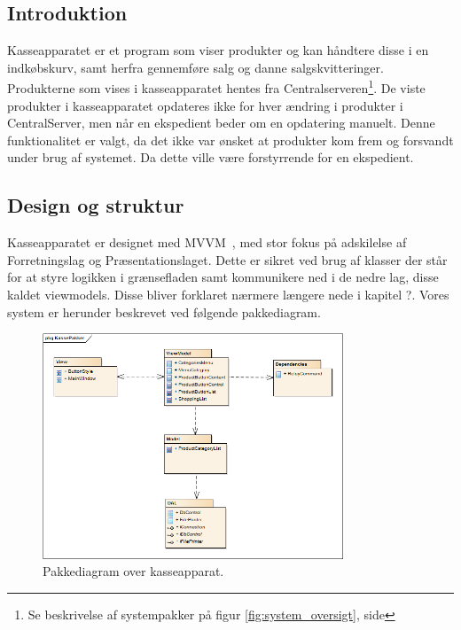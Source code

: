 \subsection{Introduktion}
Kasseapparatet er et program som viser produkter og kan håndtere disse i en indkøbskurv, samt herfra gennemføre salg og danne salgskvitteringer. Produkterne som vises i kasseapparatet hentes fra Centralserveren\footnote{Se beskrivelse af systempakker på figur \ref{fig:system_oversigt}, side \pageref{fig:system_oversigt}}. De viste produkter i kasseapparatet opdateres ikke for hver ændring i produkter i CentralServer, men når en ekspedient beder om en opdatering manuelt. Denne funktionalitet er valgt, da det ikke var ønsket at produkter kom frem og forsvandt under brug af systemet. Da dette ville være forstyrrende for en ekspedient.


\subsection{Design og struktur}
Kasseapparatet er designet med MVVM~\cite{MVVM}, med stor fokus på adskilelse af Forretningslag og Præsentationslaget. Dette er sikret ved brug af klasser der står for at styre logikken i grænsefladen samt kommunikere ned i de nedre lag, disse kaldet viewmodels. Disse bliver forklaret nærmere længere nede i kapitel ?.
Vores system er herunder beskrevet ved følgende pakkediagram.	

\begin{figure}[H]
	\centering
	\includegraphics[width=0.8\textwidth]{Systemdesign/Frontend/pics/KassePakker}
	\caption{Pakkediagram over kasseapparat.}
	\label{fig:EndeligeGUI}
\end{figure}